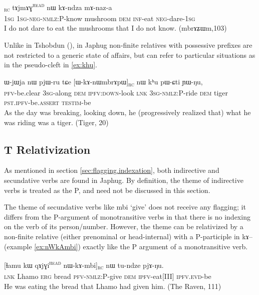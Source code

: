 \documentclass[oldfontcommands,oneside,a4paper,11pt]{article}
\newcommand{\ipa}[1]{{\phon #1}} %
\newcommand{\topic}{\textsc{dem}}
\newcommand{\tete}{\textsuperscript{\textsc{head}}}
\newcommand{\rc}{\textsubscript{\textsc{rc}}}
\begin{document}
        \begin{exe}
   \ex \label{ex:tajmag}
   \gll
[\ipa{aʑo}  	\ipa{a-mɤ-kɤ-sɯz}]\rc{}  	\ipa{tɤjmɤɣ}\tete{}  	\ipa{nɯ}  	\ipa{kɤ-ndza}  	\ipa{mɤ-naz-a}  \\
\textsc{1sg} \textsc{1sg-neg-nmlz:P}-know mushroom \textsc{dem} \textsc{inf}-eat \textsc{neg}-dare-\textsc{1sg} \\
\glt I do not dare to eat the mushrooms that I do not know. (\ipa{mbrɤʑɯm},103)
\end{exe}
 

Unlike in Tshobdun (\citealt[10]{jacksonlin07}), in Japhug non-finite relatives with possessive prefixes are not restricted to a generic state of affairs, but can refer to particular situations as in the pseudo-cleft in \ref{ex:khu}.

     \begin{exe}
   \ex \label{ex:khu}
   \gll  \ipa{lɤ-fsoʁ}  	\ipa{ɯ-jɯja}  	\ipa{nɯ}  	\ipa{pjɯ-ru}  	\ipa{tɕe}  	[\ipa{ɯ-kɤ-nɯmbrɤpɯ}]\rc{}  	\ipa{nɯ}  	\ipa{kʰu}  	\ipa{pɯ-ɕti}  	\ipa{ɲɯ-ŋu,}  \\
\textsc{pfv}-be.clear    \textsc{3sg}-along  \textsc{dem} \textsc{ipfv:down}-look \textsc{lnk} \textsc{3sg-nmlz:P}-ride \topic{} tiger \textsc{pst.ipfv}-be.\textsc{assert}  \textsc{testim}-be \\
\glt As the day was breaking, looking down, he (progressively realized that) what he was riding was a tiger. (Tiger, 20)
\end{exe}


\subsection{T Relativization}
As mentioned in section \ref{sec:flagging.indexation}, both indirective and secundative verbs are found in Japhug. By definition, the theme of indirective verbs is treated as the P, and need not be discussed in this section.

The theme of secundative verbs like \ipa{mbi} `give' does not receive any flagging; it differs from the P-argument of monotransitive verbs in that there is no indexing on the verb of its person/number. However, the theme can be relativized by a non-finite relative (either prenominal or head-internal) with a P-participle in \ipa{kɤ}--  (example \ref{ex:nWkAmbi}) exactly like the P argument of a monotransitive verb. 

\begin{exe}
\ex \label{ex:nWkAmbi}
\gll      \ipa{tɕe} 	[\ipa{ɬamu} 	\ipa{kɯ} 	\ipa{qɤjɣi}\tete{} 	\ipa{nɯ-kɤ-mbi}]\rc{} 	\ipa{nɯ} 	\ipa{tu-ndze} 	\ipa{pjɤ-ŋu.}   \\
\textsc{lnk} Lhamo \textsc{erg} bread \textsc{pfv-nmlz}:P-give \topic{} \textsc{ipfv}-eat[III] \textsc{ipfv.evd}-be  \\
 \glt    He was eating the bread that Lhamo had given him. (The Raven, 111)
\end{exe} 
\end{document}
